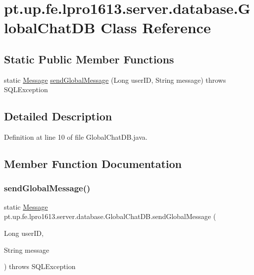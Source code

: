 \hypertarget{classpt_1_1up_1_1fe_1_1lpro1613_1_1server_1_1database_1_1_global_chat_d_b}{}\section{pt.\+up.\+fe.\+lpro1613.\+server.\+database.\+Global\+Chat\+DB Class Reference}
\label{classpt_1_1up_1_1fe_1_1lpro1613_1_1server_1_1database_1_1_global_chat_d_b}
\subsection*{Static Public Member Functions}
\begin{DoxyCompactItemize}
\item 
static \hyperlink{classpt_1_1up_1_1fe_1_1lpro1613_1_1sharedlib_1_1tuples_1_1_message}{Message} \hyperlink{classpt_1_1up_1_1fe_1_1lpro1613_1_1server_1_1database_1_1_global_chat_d_b_aefbe59782480cfbc94dddf9d80416cd4}{send\+Global\+Message} (Long user\+ID, String message)  throws S\+Q\+L\+Exception 
\end{DoxyCompactItemize}


\subsection{Detailed Description}


Definition at line 10 of file Global\+Chat\+D\+B.\+java.



\subsection{Member Function Documentation}
\hypertarget{classpt_1_1up_1_1fe_1_1lpro1613_1_1server_1_1database_1_1_global_chat_d_b_aefbe59782480cfbc94dddf9d80416cd4}{}\label{classpt_1_1up_1_1fe_1_1lpro1613_1_1server_1_1database_1_1_global_chat_d_b_aefbe59782480cfbc94dddf9d80416cd4} 
\subsubsection{\texorpdfstring{send\+Global\+Message()}{sendGlobalMessage()}}
{\footnotesize\ttfamily static \hyperlink{classpt_1_1up_1_1fe_1_1lpro1613_1_1sharedlib_1_1tuples_1_1_message}{Message} pt.\+up.\+fe.\+lpro1613.\+server.\+database.\+Global\+Chat\+D\+B.\+send\+Global\+Message (\begin{DoxyParamCaption}\item[{Long}]{user\+ID,  }\item[{String}]{message }\end{DoxyParamCaption}) throws S\+Q\+L\+Exception\hspace{0.3cm}{\ttfamily [static]}}



